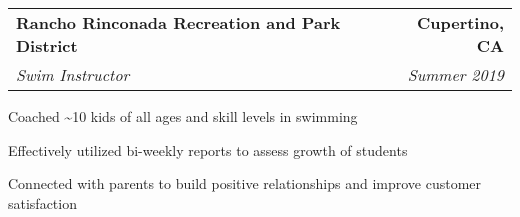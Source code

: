 \documentclass{article}
\newlength{\secskip}
\begin{document}
\goodbreak\vspace{\secskip}\par\noindent\begin{tabularx}{\linewidth}{Xr}
    \textbf{Rancho Rinconada Recreation and Park District} & \textbf{Cupertino, CA}\\
    \textit{Swim Instructor} & \textit{Summer 2019}\\
\end{tabularx}
\begin{compactitem}
    \item Coached \textasciitilde{}10 kids of all ages and skill levels in swimming
    \item Effectively utilized bi-weekly reports to assess growth of students
    \item Connected with parents to build positive relationships and improve customer satisfaction
\end{compactitem}
\end{document}
